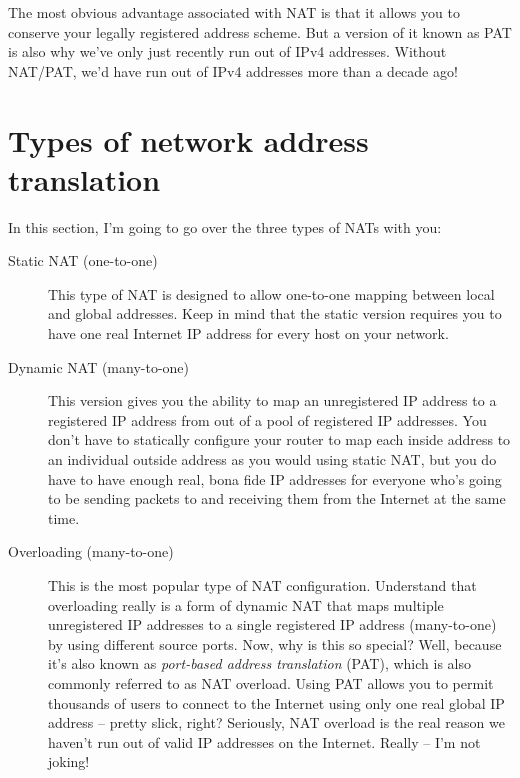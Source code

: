 \begin{note}
The most obvious advantage associated with NAT is that it allows you to conserve your legally registered address scheme.
But a version of it known as PAT is also why we've only just recently run out of IPv4 addresses.
Without NAT/PAT, we'd have run out of IPv4 addresses more than a decade ago!
\end{note}


\section{Types of network address translation}

In this section, I'm going to go over the three types of NATs with you:
\begin{description}
   \item[Static NAT (one-to-one)]
      This type of NAT is designed to allow one-to-one mapping between local and global addresses.
      Keep in mind that the static version requires you to have one real Internet IP address for every host on your network.

   \item[Dynamic NAT (many-to-one)]
      This version gives you the ability to map an unregistered IP address to a registered IP address from out of a pool of registered IP addresses.
      You don't have to statically configure your router to map each inside address to an individual outside address as you would using static NAT, but you do have to have enough real, bona fide IP addresses for everyone who's going to be sending packets to and receiving them from the Internet at the same time.

   \item[Overloading (many-to-one)]
      This is the most popular type of NAT configuration.
      Understand that overloading really is a form of dynamic NAT that maps multiple unregistered IP addresses to a single registered IP address (many-to-one) by using different source ports.
      Now, why is this so special?
      Well, because it's also known as \emph{port-based address translation} (PAT), which is also commonly referred to as NAT overload.
      Using PAT allows you to permit thousands of users to connect to the Internet using only one real global IP address -- pretty slick, right?
      Seriously, NAT overload is the real reason we haven't run out of valid IP addresses on the Internet.
      Really -- I'm not joking!
\end{description}

